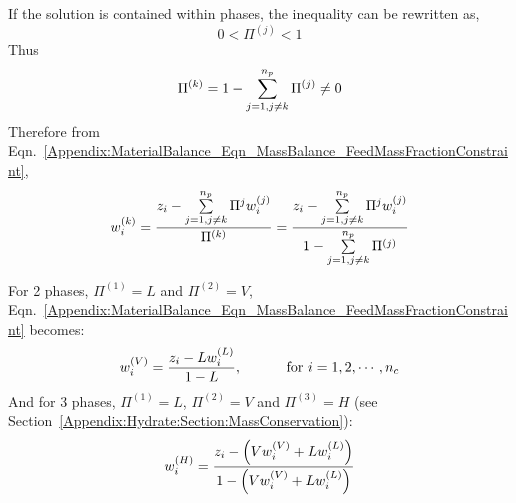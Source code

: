 If the solution is contained within  phases, the inequality can be rewritten as,
\begin{equation} 
0 < \Pi^{(j)} < 1
\end{equation}
Thus
\begin{displaymath}
\Pi^{(k)} = 1 - \summation_{j=1,j\neq k}^{n_{p}} \Pi^{(j)} \neq 0
\end{displaymath}
Therefore from Eqn.~\ref{Appendix:MaterialBalance_Eqn_MassBalance_FeedMassFractionConstraint},
\begin{equation}
w_{i}^{(k)} = \frc{z_{i}-\summation_{j=1,j\neq k}^{n_{p}}\Pi^{j}\mfr[w]{i}{j}}{\Pi^{(k)}} = \frc{z_{i} - \summation_{j=1,j\neq k}^{n_{p}}\Pi^{j}\mfr[w]{i}{j}}{1-\summation_{j=1,j\neq k}^{n_{p}}\Pi^{(j)}}
\label{Appendix:MaterialBalance_Eqn_MassBalance_FeedMassFractionConstraint2}
\end{equation}


\begin{shaded}\noindent
   For 2 phases, $\Pi^{(1)}=L$ and $\Pi^{(2)}=V$, Eqn.~\ref{Appendix:MaterialBalance_Eqn_MassBalance_FeedMassFractionConstraint} becomes:
     \begin{displaymath}
      \mfr[w]{i}{V} = \frc{z_{i}-L\mfr[w]{i}{L}}{1-L}, \hspace{1cm}\text{ for } i=1,2,\cdots,n_{c}
     \end{displaymath}
     And for 3 phases, $\Pi^{(1)}=L$, $\Pi^{(2)}=V$ and $\Pi^{(3)}=H$ (see Section~\ref{Appendix:Hydrate:Section:MassConservation}):
        \begin{displaymath}
           \mfr[w]{i}{H} = \frc{z_{i}-\left(V \mfr[w]{i}{V} + L \mfr[w]{i}{L}\right)}{1 - \left(V \mfr[w]{i}{V} + L \mfr[w]{i}{L}\right)}
        \end{displaymath}
\end{shaded}

